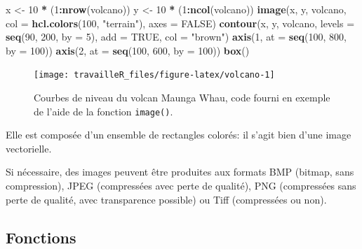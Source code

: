 \documentclass[
  12pt,
  french,
  a4paper,
  extrafontsizes,onecolumn,openright
  ]{memoir}
\newenvironment{Shaded}{\begin{snugshade}}{\end{snugshade}}
\newcommand{\DataTypeTok}[1]{\textcolor[rgb]{0.13,0.29,0.53}{#1}}
\newcommand{\DecValTok}[1]{\textcolor[rgb]{0.00,0.00,0.81}{#1}}
\newcommand{\KeywordTok}[1]{\textcolor[rgb]{0.13,0.29,0.53}{\textbf{#1}}}
\newcommand{\NormalTok}[1]{#1}
\newcommand{\OperatorTok}[1]{\textcolor[rgb]{0.81,0.36,0.00}{\textbf{#1}}}
\newcommand{\OtherTok}[1]{\textcolor[rgb]{0.56,0.35,0.01}{#1}}
\newcommand{\StringTok}[1]{\textcolor[rgb]{0.31,0.60,0.02}{#1}}
\begin{document}
\begin{Shaded}
\begin{Highlighting}[]
\NormalTok{x <-}\StringTok{ }\DecValTok{10} \OperatorTok{*}\StringTok{ }\NormalTok{(}\DecValTok{1}\OperatorTok{:}\KeywordTok{nrow}\NormalTok{(volcano))}
\NormalTok{y <-}\StringTok{ }\DecValTok{10} \OperatorTok{*}\StringTok{ }\NormalTok{(}\DecValTok{1}\OperatorTok{:}\KeywordTok{ncol}\NormalTok{(volcano))}
\KeywordTok{image}\NormalTok{(x, y, volcano, }\DataTypeTok{col =} \KeywordTok{hcl.colors}\NormalTok{(}\DecValTok{100}\NormalTok{, }\StringTok{"terrain"}\NormalTok{), }\DataTypeTok{axes =} \OtherTok{FALSE}\NormalTok{)}
\KeywordTok{contour}\NormalTok{(x, y, volcano, }\DataTypeTok{levels =} \KeywordTok{seq}\NormalTok{(}\DecValTok{90}\NormalTok{, }\DecValTok{200}\NormalTok{, }\DataTypeTok{by =} \DecValTok{5}\NormalTok{), }\DataTypeTok{add =} \OtherTok{TRUE}\NormalTok{, }
    \DataTypeTok{col =} \StringTok{"brown"}\NormalTok{)}
\KeywordTok{axis}\NormalTok{(}\DecValTok{1}\NormalTok{, }\DataTypeTok{at =} \KeywordTok{seq}\NormalTok{(}\DecValTok{100}\NormalTok{, }\DecValTok{800}\NormalTok{, }\DataTypeTok{by =} \DecValTok{100}\NormalTok{))}
\KeywordTok{axis}\NormalTok{(}\DecValTok{2}\NormalTok{, }\DataTypeTok{at =} \KeywordTok{seq}\NormalTok{(}\DecValTok{100}\NormalTok{, }\DecValTok{600}\NormalTok{, }\DataTypeTok{by =} \DecValTok{100}\NormalTok{))}
\KeywordTok{box}\NormalTok{()}
\end{Highlighting}
\end{Shaded}

\begin{figure}

{\centering \texttt{[image: travailleR\_files/figure-latex/volcano-1]} 

}

\caption{Courbes de niveau du volcan Maunga Whau, code fourni en exemple de l'aide de la fonction \texttt{image()}.}\label{fig:volcano}
\end{figure}

\normalsize

Elle est composée d'un ensemble de rectangles colorés: il s'agit bien d'une image vectorielle.

Si nécessaire, des images peuvent être produites aux formats BMP (bitmap, sans compression), JPEG (compressées avec perte de qualité), PNG (compressées sans perte de qualité, avec transparence possible) ou Tiff (compressées ou non).

\hypertarget{fonctions}{%
\subsection{Fonctions}\label{fonctions}}
\end{document}
